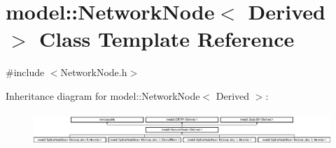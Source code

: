 \hypertarget{classmodel_1_1_network_node}{}\section{model\+:\+:Network\+Node$<$ Derived $>$ Class Template Reference}
\label{classmodel_1_1_network_node}


{\ttfamily \#include $<$Network\+Node.\+h$>$}

Inheritance diagram for model\+:\+:Network\+Node$<$ Derived $>$\+:\begin{figure}[H]
\begin{center}
\leavevmode
\includegraphics[height=1.238938cm]{classmodel_1_1_network_node}
\end{center}
\end{figure}
